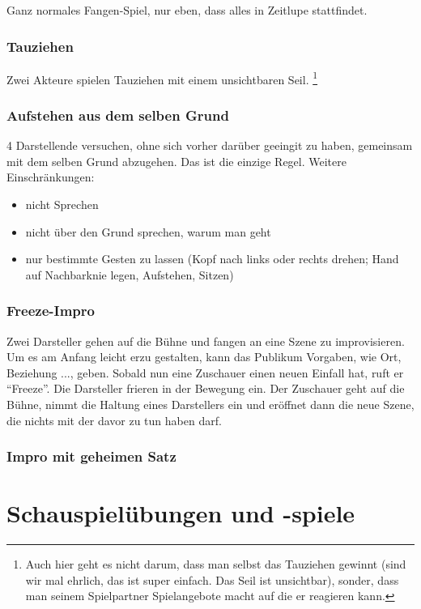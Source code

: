 \documentclass[ngerman, a4paper, twoside]{scrbook}%
\begin{document}
	Ganz normales Fangen-Spiel, nur eben, dass alles in Zeitlupe stattfindet.

	\section{Tauziehen}
	Zwei Akteure spielen Tauziehen mit einem unsichtbaren Seil.
	\footnote{Auch hier geht es nicht darum, dass man selbst das Tauziehen gewinnt (sind wir mal ehrlich, das ist super einfach. Das Seil ist unsichtbar), sonder, dass man seinem Spielpartner Spielangebote macht auf die er reagieren kann. }

	\section{Aufstehen aus dem selben Grund}
	4 Darstellende versuchen, ohne sich vorher darüber geeingit zu haben, gemeinsam mit dem selben Grund abzugehen. Das ist die einzige Regel.
	Weitere Einschränkungen:
	\begin{itemize}
		\item nicht Sprechen
		\item nicht über den Grund sprechen, warum man geht
		\item nur bestimmte Gesten zu lassen (Kopf nach links oder rechts drehen;  Hand auf Nachbarknie legen, Aufstehen, Sitzen)
	\end{itemize}

	\section{Freeze-Impro}
	Zwei Darsteller gehen auf die Bühne und fangen an eine Szene zu improvisieren. Um es am Anfang leicht erzu gestalten, kann das Publikum Vorgaben, wie Ort, Beziehung ..., geben. Sobald nun eine Zuschauer einen neuen Einfall hat, ruft er "`Freeze"'. Die Darsteller frieren in der Bewegung ein. Der Zuschauer geht auf die Bühne, nimmt die Haltung eines Darstellers ein und eröffnet dann die neue Szene, die nichts mit der davor zu tun haben darf.

	\section{Impro mit geheimen Satz}




	\setcounter{chapter}{0}
	\setcounter{section}{0}
	\part{Schauspielübungen und -spiele}
\end{document}
